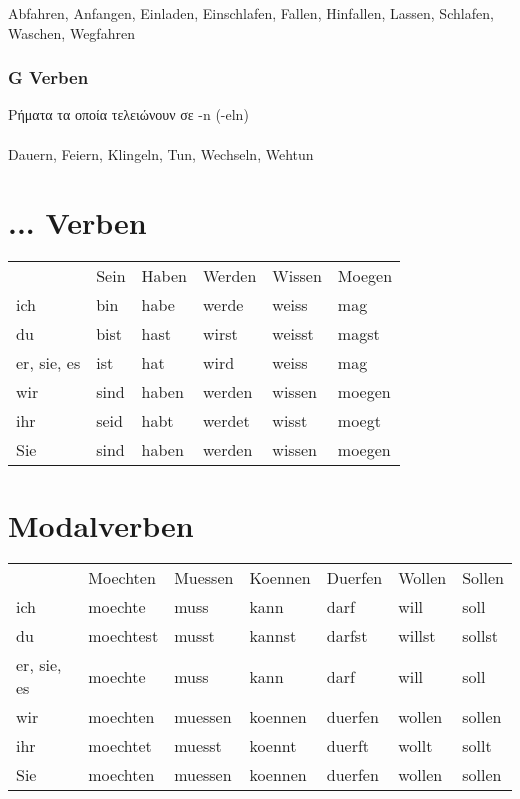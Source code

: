 \begin{appendix}
 \gls{Abfahren}, \gls{Anfangen}, \gls{Einladen}, \gls{Einschlafen},
\gls{Fallen}, \gls{Hinfallen}, \gls{Lassen}, \gls{Schlafen}, \gls{Waschen},
\gls{Wegfahren}
 
 \subsubsection{G Verben}
 Ρήματα τα οποία τελειώνουν σε -n (-eln) \\
  \\
 \gls{Dauern}, \gls{Feiern}, \gls{Klingeln}, \gls{Tun}, \gls{Wechseln}, \gls{Wehtun}
 
 \section{ ... Verben}
 \begin{tabular}{l l l l l l}
  & \gls{Sein} & \gls{Haben} & \gls{Werden} & \gls{Wissen} & \gls{Moegen} \\
  ich & bin & habe & werde & weiss & mag \\
  du & bist & hast & wirst & weisst & magst \\
  er, sie, es & ist & hat & wird & weiss & mag \\
  wir & sind & haben & werden & wissen & moegen \\
  ihr & seid & habt & werdet & wisst & moegt \\
  Sie & sind & haben & werden & wissen & moegen \\
 \end{tabular}

 
 \section{Modalverben}
 
 \begin{tabular}{l l l l l l l}
  & \gls{Moechten} & \gls{Muessen} & \gls{Koennen} & \gls{Duerfen} & \gls{Wollen} & \gls{Sollen} \\
  ich & moechte & muss & kann & darf & will & soll \\
  du & moechtest & musst & kannst & darfst & willst & sollst \\
  er, sie, es & moechte & muss & kann & darf & will & soll \\
  wir & moechten & muessen & koennen & duerfen & wollen & sollen \\
  ihr & moechtet & muesst & koennt & duerft & wollt & sollt \\
  Sie & moechten & muessen & koennen & duerfen & wollen & sollen \\
 \end{tabular}
 

\end{appendix}
